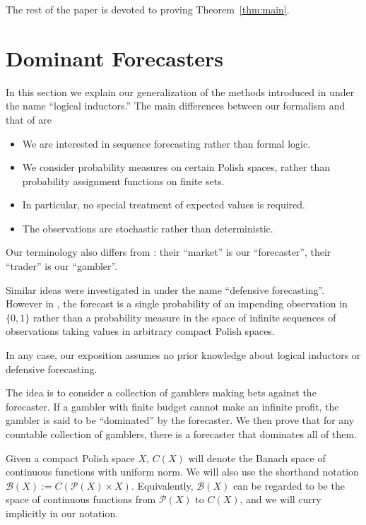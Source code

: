 \documentclass[11pt]{article}
\theoremstyle{definition}
\theoremstyle{plain}
\newcommand{\PM}{\mathcal{P}}
\newcommand{\Gm}{\mathcal{B}}
\begin{document}
The rest of the paper is devoted to proving Theorem~\ref{thm:main}.

\section{Dominant Forecasters}
\label{sec:garrabrant}

In this section we explain our generalization of the methods introduced in \cite{Garrabrant_2016} under the name \enquote{logical inductors.} The main differences between our formalism and that of \cite{Garrabrant_2016} are

\begin{itemize}
\item 
We are interested in sequence forecasting rather than formal logic.
\item
We consider probability measures on certain Polish spaces, rather than probability assignment functions on finite sets.
\item
In particular, no special treatment of expected values is required.
\item
The observations are stochastic rather than deterministic.
\end{itemize}

Our terminology also differs from \cite{Garrabrant_2016}: their \enquote{market} is our \enquote{forecaster}, their \enquote{trader} is our \enquote{gambler}.

Similar ideas were investigated in \cite{Vovk_2005} under the name \enquote{defensive forecasting}. However in \cite{Vovk_2005}, the forecast is a single probability of an impending observation in $\{0,1\}$ rather than a probability measure in the space of infinite sequences of observations taking values in arbitrary compact Polish spaces.

In any case, our exposition assumes no prior knowledge about logical inductors or defensive forecasting.

The idea is to consider a collection of gamblers making bets against the forecaster. If a gambler with finite budget cannot make an infinite profit, the gambler is said to be \enquote{dominated} by the forecaster. We then prove that for any countable collection of gamblers, there is a forecaster that dominates all of them.

Given a compact Polish space $X$, $C\left(X\right)$ will denote the Banach space of continuous functions with uniform norm. We will also use the shorthand notation $\Gm\left(X\right):=C\left(\PM\left(X\right) \times X\right)$. Equivalently, $\Gm\left(X\right)$ can be regarded to be the space of continuous functions from $\PM\left(X\right)$ to $C\left(X\right)$, and we will curry implicitly in our notation.
\end{document}
